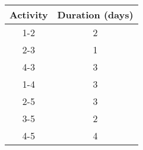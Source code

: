         \begin{tabular}{|c|c|} %
            \hline
            \textbf{Activity} & \textbf{Duration (days)} \\ %
            \hline
            1-2   & 2 \\ %
            \hline
            2-3   & 1 \\ %
            \hline
            4-3   & 3 \\
            \hline
            1-4   & 3 \\
            \hline
            2-5   & 3 \\
            \hline
            3-5   & 2 \\
            \hline
            4-5   & 4 \\
            \hline
        \end{tabular}